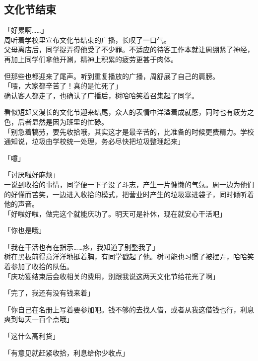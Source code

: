 \subsection{文化节结束}

「好累啊……」\\

周听着学校里宣布文化节结束的广播，长叹了一口气。\\

父母离店后，同学捉弄得他受了不少罪。不适应的待客工作本就让周绷紧了神经，再加上同学们拿他开涮，精神上积累的疲劳更甚于肉体。

但那些也都迎来了尾声。听到重复播放的广播，周舒展了自己的肩膀。\\

「喂，大家都辛苦了！真的是忙死了」\\

确认客人都走了，也确认了广播后，树哈哈笑着召集起了同学。

看似短却又漫长的文化节迎来结尾，众人的表情中洋溢着成就感，同时也有疲劳之色，后者显然是因为班里的忙碌。\\

「别急着犒劳，要先收拾哦，其实这才是最辛苦的，比准备的时候更费精力。学校通知说，垃圾由学校统一处理，务必尽快把垃圾整理起来」

「噫」

「讨厌啦好麻烦」\\

一说到收拾的事情，同学便一下子没了斗志，产生一片慵懒的气氛。周一边为他们的好懂而苦笑，一边进入收拾的模式，把营业时产生的垃圾塞进袋子，同时倾听着他的声音。\\

「好啦好啦，做完这个就能庆功了。明天可是补休，现在就安心干活吧」

「你也是哦」

「我在干活也有在指示……疼，我知道了别整我了」\\

树在黑板前得意洋洋地挺着胸，有同学戳起了他。树可能也习惯了被摆弄，哈哈笑着参加了收拾的队伍。\\

「庆功宴结束后会收相关的费用，别跟我说这两天文化节给花光了啊」

「完了，我还有没有钱来着」

「你自己在名册上写着要参加吧。钱不够的去找人借，或者从我这借钱也行，利息爽到每天一百个点哦」

「这什么高利贷」

「有意见就赶紧收拾，利息给你少收点」

